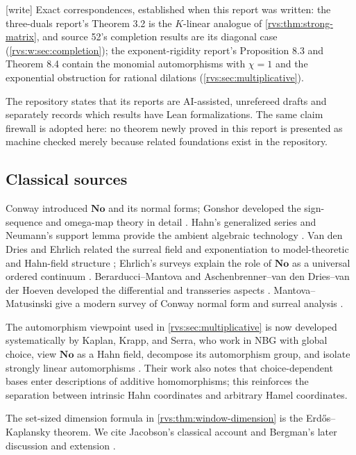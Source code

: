\documentclass[11pt,letterpaper]{article}
\numberwithin{equation}{section}
\theoremstyle{definition}
\theoremstyle{remark}
\newcommand{\No}{\mathbf{No}}
\newcommand{\wtag}{\textup{[write]}}%
\begin{document}
\noindent\wtag{} Exact correspondences, established when this report was
written: the three-duals report's Theorem 3.2 is the \(K\)-linear analogue of
\cref{rvs:thm:strong-matrix}, and source 52's completion results are its
diagonal case (\cref{rvs:w:sec:completion}); the exponent-rigidity report's
Proposition 8.3 and Theorem 8.4 contain the monomial automorphisms with
\(\chi=1\) and the exponential obstruction for rational dilations
(\cref{rvs:sec:multiplicative}).


The repository states that its reports are AI-assisted, unrefereed drafts and
separately records which results have Lean formalizations.  The same claim
firewall is adopted here: no theorem newly proved in this report is presented
as machine checked merely because related foundations exist in the repository.

\subsection{Classical sources}

Conway introduced \(\No\) and its normal forms; Gonshor developed the sign-
sequence and omega-map theory in detail \cite{Conway,Gonshor}.  Hahn's
generalized series and Neumann's support lemma provide the ambient algebraic
technology \cite{Hahn,Neumann}.  Van den Dries and Ehrlich related the surreal
field and exponentiation to model-theoretic and Hahn-field structure
\cite{vdDE}; Ehrlich's surveys explain the role of \(\No\) as a universal
ordered continuum \cite{Ehrlich2012}.  Berarducci--Mantova and
Aschenbrenner--van den Dries--van der Hoeven developed the differential and
transseries aspects \cite{BerarducciMantova,ADH}.  Mantova--Matusinski give a
modern survey of Conway normal form and surreal analysis
\cite{MantovaMatusinski}.

The automorphism viewpoint used in \cref{rvs:sec:multiplicative} is now developed
systematically by Kaplan, Krapp, and Serra, who work in NBG with global choice,
view \(\No\) as a Hahn field, decompose its automorphism group, and isolate
strongly linear automorphisms \cite{KKS}.  Their work also notes that
choice-dependent bases enter descriptions of additive homomorphisms; this
reinforces the separation between intrinsic Hahn coordinates and arbitrary
Hamel coordinates.

The set-sized dimension formula in \cref{rvs:thm:window-dimension} is the
Erd\H{o}s--Kaplansky theorem.  We cite Jacobson's classical account and Bergman's
later discussion and extension \cite{Jacobson,Bergman}.
\end{document}
